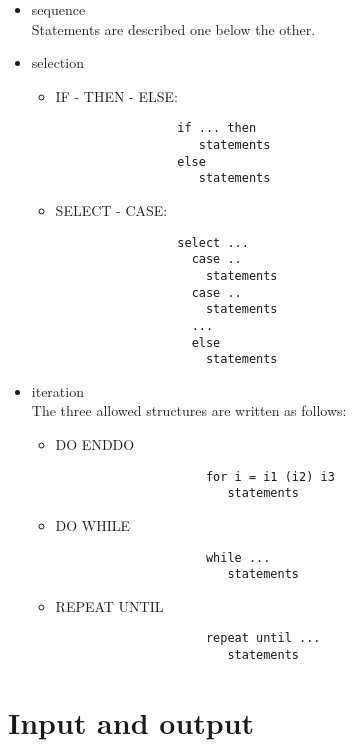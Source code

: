 \documentclass[12pt]{book}
\begin{document}
\begin{itemize}
  \item sequence\\
        Statements are described one below the other.
  \item selection
        \begin{itemize}
          \item IF - THEN - ELSE:
              \begin{verbatim}
                 if ... then
                    statements
                 else
                    statements
              \end{verbatim}
          \item SELECT - CASE:
              \begin{verbatim}
                 select ...
                   case ..
                     statements
                   case ..
                     statements
                   ...
                   else
                     statements
              \end{verbatim}
        \end{itemize}
  \item iteration\\
        The three allowed structures are written as follows:
        \begin{itemize}
           \item DO ENDDO
                  \begin{verbatim}
                     for i = i1 (i2) i3
                        statements
                  \end{verbatim}
           \item DO WHILE
                  \begin{verbatim}
                     while ...
                        statements
                  \end{verbatim}
           \item REPEAT UNTIL
                  \begin{verbatim}
                     repeat until ...
                        statements
                  \end{verbatim}
        \end{itemize}
\end{itemize}

\section{Input and output}
\end{document}
